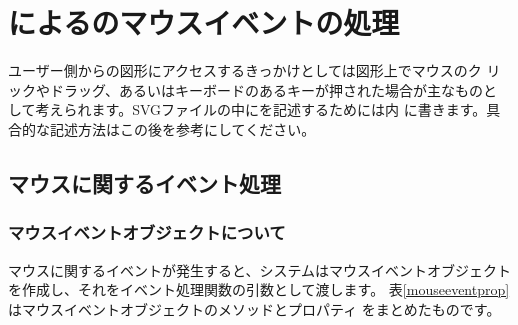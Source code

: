 \section{\JS による\SVG のマウスイベントの処理}
ユーザー側から\SVG の図形にアクセスするきっかけとしては図形上でマウスのク
リックやドラッグ、あるいはキーボードのあるキーが押された場合が主なものと
して考えられます。SVGファイルの中に\JS を記述するためには内
に書きます。具合的な記述方法はこの後を参考にしてください。
\subsection{マウスに関するイベント処理}
\subsubsection{マウスイベントオブジェクトについて}
マウスに関するイベントが発生すると、システムはマウスイベントオブジェクト
を作成し、それをイベント処理関数の引数として渡します。
表\ref{mouseeventprop}はマウスイベントオブジェクトのメソッドとプロパティ
をまとめたものです。
\newcommand{\ShowRaw}[4]{#2&#3&#4&#1\\\hline}
